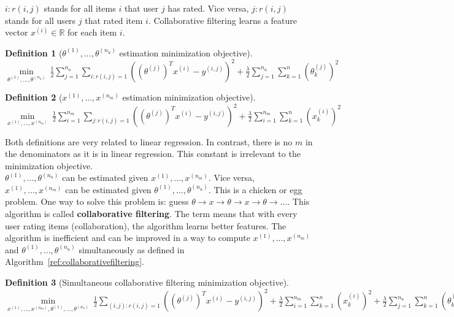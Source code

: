 \documentclass{report}
\newtheorem{definition}{Definition}[section]
\begin{document}
$i:r(i,j)$ stands for all items $i$ that user $j$ has rated. Vice versa, $j:r(i,j)$ stands for all users $j$ that rated item $i$. Collaborative filtering learns a feature vector $x^{(i)}\in \mathbb{R}$ for each item $i$.

\begin{definition}[$\theta^{(1)},...,\theta^{(n_u)}$ estimation minimization objective]~\\
 $\min\limits_{\theta^{(1)},...,\theta^{(n_u)}}\:\frac{1}{2}\sum_{j=1}^{n_u}\sum_{i:r(i,j)=1}((\theta^{(j)})^Tx^{(i)}-y^{(i,j)})^2+\frac{\lambda}{2}\sum_{j=1}^{n_u}\sum_{k=1}^{n}(\theta_k^{(j)})^2$
\end{definition}

\begin{definition}[$x^{(1)},...,x^{(n_m)}$ estimation minimization objective]~\\
 $\min\limits_{x^{(1)},...,x^{(n_m)}}\:\frac{1}{2}\sum_{i=1}^{n_m}\sum_{j:r(i,j)=1}((\theta^{(j)})^Tx^{(i)}-y^{(i,j)})^2+\frac{\lambda}{2}\sum_{i=1}^{n_m}\sum_{k=1}^{n}(x_k^{(i)})^2$
\end{definition}


Both definitions are very related to linear regression. In contrast, there is no $m$ in the denominators as it is in linear regression. This constant is irrelevant to the minimization objective. \\

$\theta^{(1)},...,\theta^{(n_u)}$ can be estimated given $x^{(1)},...,x^{(n_m)}$. Vice versa, $x^{(1)},...,x^{(n_m)}$ can be estimated given $\theta^{(1)},...,\theta^{(n_u)}$. This is a chicken or egg problem. One way to solve this problem is: guess $\theta \rightarrow x \rightarrow \theta \rightarrow x  \rightarrow \theta \rightarrow ...$. This algorithm is called {\bf collaborative filtering}. The term means that with every user rating items (collaboration), the algorithm learns better features. The algorithm is inefficient and can be improved in a way to compute $x^{(1)},...,x^{(n_m)}$ and $\theta^{(1)},...,\theta^{(n_u)}$ simultaneously as defined in Algorithm~\ref{ref:collaborativefiltering}.

\begin{definition}[Simultaneous collaborative filtering minimization objective]~\\
 $\min\limits_{x^{(1)},...,x^{(n_m)},\theta^{(1)},...,\theta^{(n_u)}}\:\frac{1}{2}\sum_{(i,j):r(i,j)=1}((\theta^{(j)})^Tx^{(i)}-y^{(i,j)})^2+\frac{\lambda}{2}\sum_{i=1}^{n_m}\sum_{k=1}^{n}(x_k^{(i)})^2+\frac{\lambda}{2}\sum_{j=1}^{n_u}\sum_{k=1}^{n}(\theta_k^{(j)})^2$
\end{definition}
\end{document}
